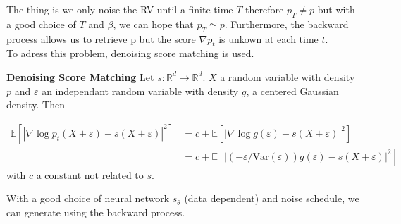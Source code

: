 \documentclass{article}
\begin{document}
The thing is we only noise the RV until a finite time \(T\) therefore \(p_T\not= p\) but with a good choice of \(T\) and \(\beta\), we can hope that \(p_T\simeq p\). Furthermore, the backward process allows us to retrieve p but the score \(\nabla p_t\) is unkown at each time \(t\). \\
To adress this problem, denoising score matching is used.  

\bigskip
\textbf{Denoising Score Matching} \newline
Let \(s:\mathbb{R}^d\rightarrow\mathbb{R}^d\). \(X\) a random variable with density \(p\) and \(\varepsilon\) an independant random variable with density \(g\), a centered Gaussian density. Then 

\begin{align}
    \mathbb{E}[|\nabla \log p_t (X+\varepsilon)-s(X+\varepsilon)|^2]&=c+\mathbb{E}[|\nabla \log g(\varepsilon)-s(X+\varepsilon)|^2]\\
    &=c+\mathbb{E}[|(-\varepsilon/\text{Var} (\varepsilon))g(\varepsilon)-s(X+\varepsilon)|^2]
\end{align}
with \(c\) a constant not related to \(s\).

With a good choice of neural network \(s_\theta\) (data dependent) and noise schedule, we can generate using the backward process.

\nocite{Coste_2025}
\nocite{lipman2024flowmatchingguidecode}


\end{document}
